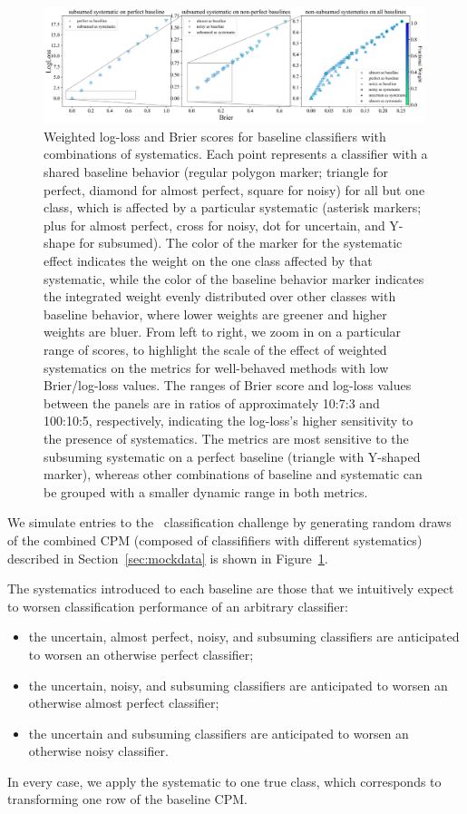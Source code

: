 \begin{figure}
	\begin{center}
		\includegraphics[width=0.99\textwidth]{./fig/multipanel_res.png}
		\caption{
		Weighted log-loss and Brier scores for baseline classifiers with combinations of systematics.
		Each point represents a classifier with a shared baseline behavior (regular polygon marker; triangle for perfect, diamond for almost perfect, square for noisy) for all but one class, which is affected by a particular systematic (asterisk markers; plus for almost perfect, cross for noisy, dot for uncertain, and Y-shape for subsumed).
		The color of the marker for the systematic effect indicates the weight on the one class affected by that systematic, while the color of the baseline behavior marker indicates the integrated weight evenly distributed over other classes with baseline behavior, where lower weights are greener and higher weights are bluer.
		From left to right, we zoom in on a particular range of scores, to highlight the scale of the effect of weighted systematics on the metrics for well-behaved methods with low Brier/log-loss values.
		The ranges of Brier score and log-loss values between the panels are in ratios of approximately 10:7:3 and 100:10:5, respectively, indicating the log-loss's higher sensitivity to the presence of systematics.
		The metrics are most sensitive to the subsuming systematic on a perfect baseline (triangle with Y-shaped marker), whereas other combinations of baseline and systematic can be grouped with a smaller dynamic range in both metrics.
		}
	\end{center}
	\label{fig:all_combined}
\end{figure}
We simulate entries to the \plasticc\ classification challenge by generating random draws of the combined CPM (composed of classififiers with different systematics) described in Section~\ref{sec:mockdata} is shown in Figure~\ref{fig:all_combined}.

The systematics introduced to each baseline are those that we intuitively expect to worsen classification performance of an arbitrary classifier:
\begin{itemize}
\item the uncertain, almost perfect, noisy, and subsuming classifiers are anticipated to worsen an otherwise perfect classifier;
\item the uncertain, noisy, and subsuming classifiers are anticipated to worsen an otherwise almost perfect classifier;
\item the uncertain and subsuming classifiers are anticipated to worsen an otherwise noisy classifier.
\end{itemize}
In every case, we apply the systematic to one true class, which corresponds to transforming one row of the baseline CPM.

